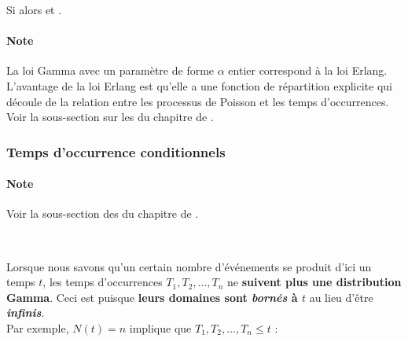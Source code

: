 \documentclass[10pt, french]{article}
\begin{document}
\begin{multicols*}{2}
\begin{definitionNOHFILLprop}
Si  alors  et .\\

\paragraph{Note}	La loi Gamma avec un paramètre de forme $\alpha$ entier correspond à la loi Erlang. L'avantage de la loi Erlang est qu'elle a une fonction de répartition explicite qui découle de la relation entre les processus de Poisson et les temps d'occurrences. Voir la sous-section sur les \textbf{} du chapitre de .
\end{definitionNOHFILLprop}


\subsubsection{Temps d'occurrence conditionnels}
\paragraph{Note}	Voir la sous-section des \textbf{} du chapitre de .

\

Lorsque nous savons qu'un certain nombre d'événements se produit d'ici un temps $t$, les temps d'occurrences $T_{1}, T_{2}, \dots, T_{n}$ ne \textbf{suivent plus une distribution Gamma}. Ceci est puisque \textbf{leurs domaines sont \textit{bornés} à $t$} au lieu d'être \textit{\textbf{infinis}}. \\

Par exemple, $N(t) = n$ implique que $T_{1}, T_{2}, \dots, T_{n} \leq t$ :
\begin{center}
\begin{tikzpicture}[x=0.75pt,y=0.75pt,yscale=-1,xscale=1]


\end{tikzpicture}
\end{center}
\end{multicols*}
\end{document}
